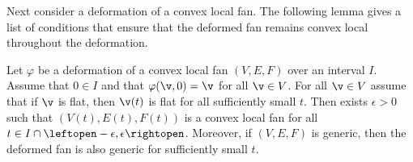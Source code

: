 Next consider a deformation of a convex local fan.  The following lemma
gives a list of conditions that ensure that the deformed fan remains
convex local throughout the deformation.


\begin{lemma}[]\label{lemma:fan-open}
Let $\varphi$ be a deformation of a convex local fan $(V,E,F)$ over an
interval $I$.  Assume that $0\in I$ and that $\varphi(\v,0)=\v$ for
all $\v\in V$.  For all $\v\in V$ assume that if
$\v$ is flat, then $\v(t)$ is flat for all sufficiently small $t$.
Then exists $\epsilon>0$ such that $(V(t),E(t),F(t))$ is a convex local fan
for all $t\in I\cap \leftopen-\epsilon,\epsilon\rightopen$.  
Moreover,  if $(V,E,F)$ is
generic, then the deformed fan is also generic for sufficiently small
$t$.
\end{lemma}

